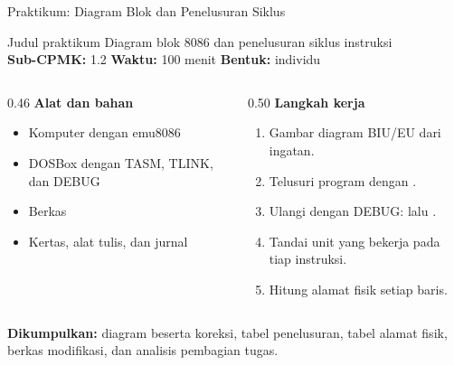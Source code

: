 \documentclass[aspectratio=169,11pt]{beamer}
\begin{document}
\begin{frame}{Praktikum: Diagram Blok dan Penelusuran Siklus}
\begin{block}{Judul praktikum}
\small Diagram blok 8086 dan penelusuran siklus instruksi\\[0.15em]
\textbf{Sub-CPMK:} 1.2 \quad\textbullet\quad
\textbf{Waktu:} 100 menit \quad\textbullet\quad
\textbf{Bentuk:} individu
\end{block}

\vspace{0.2em}
\begin{columns}[t]
\begin{column}{0.46\textwidth}
{\color{obeBlue}\bfseries Alat dan bahan}
\begin{itemize}\footnotesize
    \item Komputer dengan emu8086
    \item DOSBox dengan TASM, TLINK, dan DEBUG
    \item Berkas 
    \item Kertas, alat tulis, dan jurnal
\end{itemize}
\end{column}
\begin{column}{0.50\textwidth}
{\color{obeBlue}\bfseries Langkah kerja}
\begin{enumerate}\footnotesize
    \item Gambar diagram BIU/EU dari ingatan.
    \item Telusuri program dengan .
    \item Ulangi dengan DEBUG:  lalu .
    \item Tandai unit yang bekerja pada tiap instruksi.
    \item Hitung alamat fisik setiap baris.
\end{enumerate}
\end{column}
\end{columns}

\vspace{0.2em}
{\footnotesize\textbf{Dikumpulkan:} diagram beserta koreksi, tabel
penelusuran, tabel alamat fisik, berkas  modifikasi, dan
analisis pembagian tugas.\par}
\end{frame}
\end{document}
